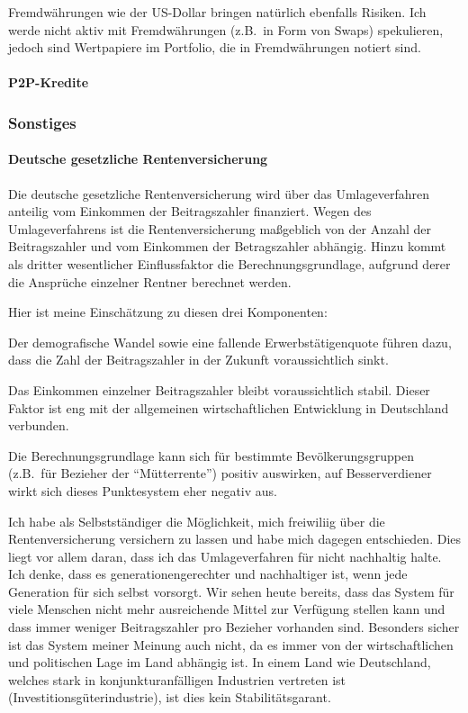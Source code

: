 \documentclass{article}
\begin{document}
Fremdwährungen wie der US-Dollar bringen natürlich ebenfalls Risiken. Ich werde nicht aktiv mit Fremdwährungen (z.B.\ in Form von Swaps) spekulieren, jedoch sind Wertpapiere im Portfolio, die in Fremdwährungen notiert sind.

\paragraph{P2P-Kredite}



\subsubsection{Sonstiges}

\paragraph{Deutsche gesetzliche Rentenversicherung}

Die deutsche gesetzliche Rentenversicherung wird über das Umlageverfahren anteilig vom Einkommen der Beitragszahler finanziert. Wegen des Umlageverfahrens ist die Rentenversicherung maßgeblich von der Anzahl der Beitragszahler und vom Einkommen der Betragszahler abhängig. Hinzu kommt als dritter wesentlicher Einflussfaktor die Berechnungsgrundlage, aufgrund derer die Ansprüche einzelner Rentner berechnet werden.

Hier ist meine Einschätzung zu diesen drei Komponenten:

Der demografische Wandel sowie eine fallende Erwerbstätigenquote führen dazu, dass die Zahl der Beitragszahler in der Zukunft voraussichtlich sinkt.

Das Einkommen einzelner Beitragszahler bleibt voraussichtlich stabil. Dieser Faktor ist eng mit der allgemeinen wirtschaftlichen Entwicklung in Deutschland verbunden.

Die Berechnungsgrundlage kann sich für bestimmte Bevölkerungsgruppen (z.B.\ für Bezieher der ``Mütterrente'') positiv auswirken, auf Besserverdiener wirkt sich dieses Punktesystem eher negativ aus.

Ich habe als Selbstständiger die Möglichkeit, mich freiwiliig über die Rentenversicherung versichern zu lassen und habe mich dagegen entschieden. Dies liegt vor allem daran, dass ich das Umlageverfahren für nicht nachhaltig halte. Ich denke, dass es generationengerechter und nachhaltiger ist, wenn jede Generation für sich selbst vorsorgt. Wir sehen heute bereits, dass das System für viele Menschen nicht mehr ausreichende Mittel zur Verfügung stellen kann und dass immer weniger Beitragszahler pro Bezieher vorhanden sind. Besonders sicher ist das System meiner Meinung auch nicht, da es immer von der wirtschaftlichen und politischen Lage im Land abhängig ist. In einem Land wie Deutschland, welches stark in konjunkturanfälligen Industrien vertreten ist (Investitionsgüterindustrie), ist dies kein Stabilitätsgarant.
\end{document}
